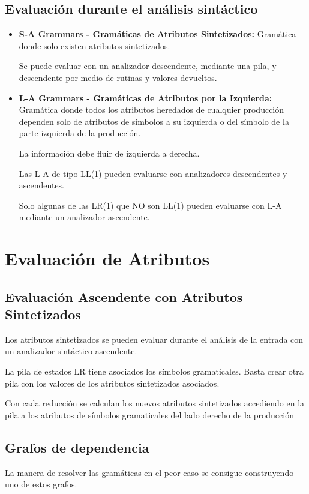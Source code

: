 \documentclass[12pt]{report} %
\begin{document}
\subsection{Evaluación durante el análisis sintáctico}
\begin{itemize}
  \item \textbf{S-A Grammars - Gramáticas de Atributos Sintetizados:} Gramática donde solo existen atributos sintetizados.
  
  Se puede evaluar con un analizador descendente, mediante una pila, y descendente por medio de rutinas y valores devueltos.
  \item \textbf{L-A Grammars - Gramáticas de Atributos por la Izquierda:} Gramática donde todos los atributos heredados de cualquier producción dependen solo de atributos de símbolos a su izquierda o del símbolo de la parte izquierda de la producción.
  
  La información debe fluir de izquierda a derecha.

  Las L-A de tipo LL(1) pueden evaluarse con analizadores descendentes y ascendentes.

  Solo algunas de las LR(1) que NO son LL(1) pueden evaluarse con L-A mediante un analizador ascendente.
\end{itemize}

\section{Evaluación de Atributos}
\subsection{Evaluación Ascendente con Atributos Sintetizados}
Los atributos sintetizados se pueden evaluar durante el análisis de la entrada con un analizador sintáctico ascendente.

La pila de estados LR tiene asociados los símbolos gramaticales.
Basta crear otra pila con los valores de los atributos sintetizados asociados.

Con cada reducción se calculan los nuevos atributos sintetizados accediendo en la pila a los atributos de símbolos gramaticales del lado derecho de la producción

\subsection{Grafos de dependencia}
La manera de resolver las gramáticas en el peor caso se consigue construyendo uno de estos grafos.
\end{document}
